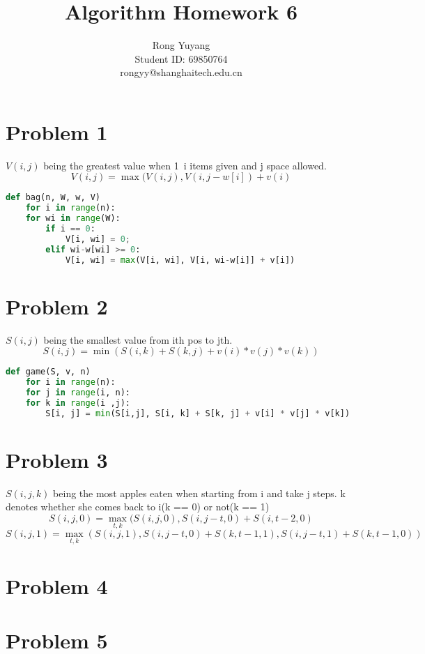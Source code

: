 \documentclass{article}
\title{Algorithm Homework 6}
\author{Rong Yuyang \\ Student ID: 69850764 \\ rongyy@shanghaitech.edu.cn}
\begin{document}
\maketitle

\section*{Problem 1}
$V(i, j)$ being the greatest value when 1~i items given and j space allowed.
$$V(i, j) = \max(V(i, j), V(i, j-w[i]) + v(i)$$
\begin{lstlisting}[language = python]
def bag(n, W, w, V)
	for i in range(n):
	for wi in range(W):
		if i == 0:
			V[i, wi] = 0;
		elif wi-w[wi] >= 0:
			V[i, wi] = max(V[i, wi], V[i, wi-w[i]] + v[i])
\end{lstlisting}
\section*{Problem 2}
$S(i, j)$ being the smallest value from ith pos to jth.
$$S(i, j) = \min(S(i, k) + S(k, j) + v(i) * v(j) * v(k))$$
\begin{lstlisting}[language = python]
def game(S, v, n)
	for i in range(n):
	for j in range(i, n):
	for k in range(i ,j):
		S[i, j] = min(S[i,j], S[i, k] + S[k, j] + v[i] * v[j] * v[k])
\end{lstlisting}
\section*{Problem 3}
$S(i, j, k)$ being the most apples eaten when starting from i and take j steps. k denotes whether she comes back to i(k == 0) or not(k == 1)
$$S(i, j, 0) = \max_{t, k}(S(i, j, 0), S(i, j-t, 0) + S(i, t-2, 0)$$
$$S(i, j, 1) = \max_{t, k}(S(i, j, 1), S(i, j-t, 0) + S(k, t-1, 1), S(i, j-t, 1) + S(k, t-1, 0))$$
\section*{Problem 4}
\section*{Problem 5}
\end{document}

